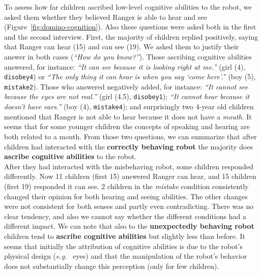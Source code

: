 \documentclass{sig-alternate}
\newcommand{\eg}{{\textit{e.g.~}}}
\begin{document}
To assess how far children ascribed low-level cognitive abilities to the robot,
we asked them whether they believed Ranger is able to hear and see
(Figure~\ref{fig:domino-cognition}). Also these questions were asked both in the
first and the second interview. First, the majority of children replied
positively, saying that Ranger can hear (15) and can see (19). We asked them to
justify their answer in both cases (\textit{``How do you know?''}). Those
ascribing cognitive abilities answered, for instance: \textit{``It can see
because it is looking right at me.''} (girl (4), \texttt{disobey4}) or
\textit{``The only thing it can hear is when you say `come here'.''} (boy (5),
\texttt{mistake2}). Those who answered negatively added, for instance:
\textit{``It cannot see because the eyes are not real.''} (girl (4.5),
\texttt{disobey1}); \textit{``It cannot hear because it doesn't have ears.''}
(boy (4), \texttt{mistake4}); and surprisingly two 4-year old children mentioned
that Ranger is not able to hear because it does not have a \textit{mouth}. It
seems that for some younger children the concepts of speaking and hearing are
both related to a mouth. From those two questions, we can summarize that after
children had interacted with the \textbf{correctly behaving robot} the majority
does \textbf{ascribe cognitive abilities} to the robot.\\

After they had interacted with the misbehaving robot, some children responded
differently. Now 11 children (first 15) answered Ranger can hear, and 15
children (first 19) responded it can see. 2 children in the \textit{mistake}
condition consistently changed their opinion for both hearing and seeing
abilities. The other changes were not consistent for both senses and partly even
contradicting. There was no clear tendency, and also we cannot say whether the
different conditions had a different impact. We can note that also to the
\textbf{unexpectedly behaving robot} children tend to \textbf{ascribe cognitive
abilities} but slightly less than before. It seems that initially the
attribution of cognitive abilities is due to the robot's physical design (\eg
eyes) and that the manipulation of the robot's behavior does not substantially
change this perception (only for few children). 


	
\end{document}
